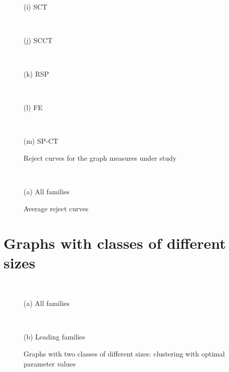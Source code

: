 \documentclass{article}
\begin{document}
\begin{figure}[H]
	\begin{minipage}{.195\textwidth} %
		\\\centerline{(i) SCT}
	\end{minipage}
	\begin{minipage}{.195\textwidth} %
		\\\centerline{(j) SCCT}
	\end{minipage}
	\begin{minipage}{.195\textwidth} %
		\\\centerline{(k) RSP}
	\end{minipage}
	\begin{minipage}{.195\textwidth} %
		\\\centerline{(l) FE}
	\end{minipage}
	\begin{minipage}{.195\textwidth} %
		\\\centerline{(m) SP-CT}
	\end{minipage}

    \caption{\label{f_Reject}Reject curves for the graph measures under study}
\end{figure}

\begin{figure}[H] %
	\begin{minipage}{.56\textwidth}
		\\\centerline{(a) All families}
	\end{minipage}%
\caption{\label{f_Rcur}Average reject curves}
\end{figure}


\newpage
\section{Graphs with classes of different sizes}
\begin{figure}[H]
	\begin{minipage}{.5\textwidth}
		\\\centerline{(a) All families}
	\end{minipage}%
	\begin{minipage}{.5\textwidth}
		\\\centerline{(b) Leading families}
	\end{minipage}
\caption{\label{f_difClas}Graphs with two classes of different sizes: clustering with optimal parameter values}
\end{figure}
\end{document}
